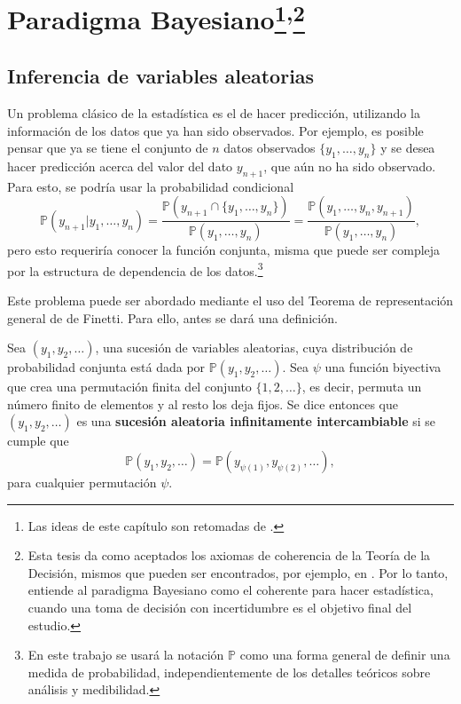 \chapter[Paradigma Bayesiano]{Paradigma Bayesiano\footnote{Las ideas de este cap\'itulo son retomadas de \cite{Denison_BayesMethods}.}\textsuperscript{,}\footnote{Esta tesis da como aceptados los axiomas de coherencia de la Teoría de la Decisión, mismos que pueden ser encontrados, por ejemplo, en \cite{Fishburn_Axioms}. Por lo tanto, entiende al paradigma Bayesiano como el coherente para hacer estad\'istica, cuando una toma de decisi\'on con incertidumbre es el objetivo final del estudio. 
}}
\label{chap:Bayesian}

\section{Inferencia de variables aleatorias}

Un problema clásico de la estad\'istica es el de hacer predicci\'on, utilizando la informaci\'on de los datos que ya han sido observados. Por ejemplo, es posible pensar que ya se tiene el conjunto de $n$ datos observados $\{y_1, \ldots, y_n\}$ y se desea hacer predicci\'on acerca del valor del dato $y_{n+1}$, que a\'un no ha sido observado. Para esto, se podr\'ia usar la probabilidad condicional
\begin{equation*}
    \mathbb{P}(y_{n+1}|y_1,\ldots,y_n) =
    \frac{\mathbb{P}(y_{n+1} \cap \{y_1, \ldots, y_n\})}{\mathbb{P}(y_1, \ldots, y_n)} =
    \frac{\mathbb{P}(y_1, \ldots, y_n,y_{n+1})}{\mathbb{P}(y_1, \ldots, y_n)},
\end{equation*}
pero esto requerir\'ia conocer la funci\'on conjunta, misma que puede ser compleja por la estructura de dependencia de los datos.\footnote{En este trabajo se usar\'a la notaci\'on $\mathbb{P}$ como una forma general de definir una medida de probabilidad, independientemente de los detalles te\'oricos sobre an\'alisis y medibilidad.}

Este problema puede ser abordado mediante el uso del Teorema de representaci\'on general de de Finetti. Para ello, antes se dar\'a una definici\'on.

\begin{defin*}
    Sea $(y_1,y_2,\ldots)$, una sucesi\'on de variables aleatorias, cuya distribuci\'on de probabilidad conjunta est\'a dada por $\mathbb{P}(y_1,y_2,\ldots)$. Sea $\psi$ una funci\'on biyectiva que crea una permutaci\'on finita del conjunto $\{1,2,\ldots\}$, es decir, permuta un n\'umero finito de elementos y al resto los deja fijos.  
    Se dice entonces que $(y_1,y_2,\ldots)$ es una \textbf{sucesi\'on aleatoria infinitamente intercambiable} si se cumple que 
    \begin{equation*}
        \mathbb{P}(y_1,y_2,\ldots) = \mathbb{P}(y_{\psi(1)},y_{\psi(2)},\ldots),
    \end{equation*}
    para cualquier permutaci\'on $\psi$.
\end{defin*}

